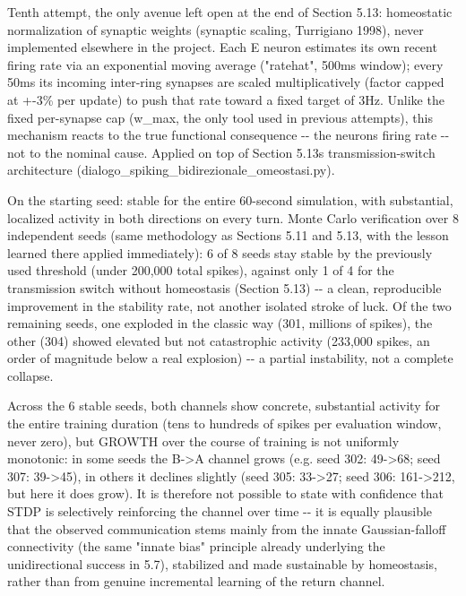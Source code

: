\documentclass[
  english,
]{article}
\begin{document}
Tenth attempt, the only avenue left open at the end of Section 5.13: homeostatic normalization of synaptic weights (synaptic scaling, Turrigiano 1998), never implemented elsewhere in the project. Each E neuron estimates its own recent firing rate via an exponential moving average ("ratehat", 500ms window); every 50ms its incoming inter-ring synapses are scaled multiplicatively (factor capped at +-3\% per update) to push that rate toward a fixed target of 3Hz. Unlike the fixed per-synapse cap (w\_\allowbreak{}max, the only tool used in previous attempts), this mechanism reacts to the true functional consequence -\/- the neuron\textquotesingle s firing rate -\/- not to the nominal cause. Applied on top of Section 5.13\textquotesingle s transmission-switch architecture (dialogo\_\allowbreak{}spiking\_\allowbreak{}bidirezionale\_\allowbreak{}omeostasi.py).

On the starting seed: stable for the entire 60-second simulation, with substantial, localized activity in both directions on every turn. Monte Carlo verification over 8 independent seeds (same methodology as Sections 5.11 and 5.13, with the lesson learned there applied immediately): 6 of 8 seeds stay stable by the previously used threshold (under 200,000 total spikes), against only 1 of 4 for the transmission switch without homeostasis (Section 5.13) -\/- a clean, reproducible improvement in the stability rate, not another isolated stroke of luck. Of the two remaining seeds, one exploded in the classic way (301, millions of spikes), the other (304) showed elevated but not catastrophic activity (233,000 spikes, an order of magnitude below a real explosion) -\/- a partial instability, not a complete collapse.

Across the 6 stable seeds, both channels show concrete, substantial activity for the entire training duration (tens to hundreds of spikes per evaluation window, never zero), but GROWTH over the course of training is not uniformly monotonic: in some seeds the B-\textgreater A channel grows (e.g. seed 302: 49-\textgreater68; seed 307: 39-\textgreater45), in others it declines slightly (seed 305: 33-\textgreater27; seed 306: 161-\textgreater212, but here it does grow). It is therefore not possible to state with confidence that STDP is selectively reinforcing the channel over time -\/- it is equally plausible that the observed communication stems mainly from the innate Gaussian-falloff connectivity (the same "innate bias" principle already underlying the unidirectional success in 5.7), stabilized and made sustainable by homeostasis, rather than from genuine incremental learning of the return channel.
\end{document}
